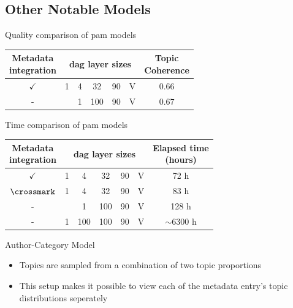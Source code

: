 \subsection{Other Notable Models}

\begin{frame}{\insertsubsection}{Quality comparison of \acrshort{pam} models}
	\centering
	\begin{tabular}{c|c|c|c|c|c|c}
		\makecell{Metadata \\ integration} & \multicolumn{5}{c}{\gls{dag} layer sizes} \vline & \makecell{Topic \\ Coherence} \\
		\hline
		$\checkmark$ & 1 & 4 & 32 & 90 & V & $0.66$\\
		- & & 1 & 100 & 90 & V & $0.67$ \\
	\end{tabular}
\end{frame}


\begin{frame}{\insertsubsection}{Time comparison of \acrshort{pam} models}
	\begin{tabular}{c|c|c|c|c|c|c}
		\makecell{Metadata \\ integration} & \multicolumn{5}{c}{\gls{dag} layer sizes} \vline & \makecell{Elapsed time \\ (hours)} \\
		\hline
		$\checkmark$ & 1 & 4 & 32 & 90 & V & 72 h\\
		$\crossmark$ & 1 & 4 & 32 & 90 & V & 83 h\\
		- & & 1 & 100 & 90 & V &  128 h\\
		- & 1 & 100 & 100 & 90 & V & $\sim 6300$ h\\
	\end{tabular}
\end{frame}

\begin{frame}{\insertsubsection}{Author-Category Model}
	\begin{figure}
		\centering
		\resizebox{0.3\columnwidth}{!}{%
			
		}
	\end{figure}
	\begin{itemize}
		\item<1-> Topics are sampled from a combination of two topic proportions
		\item<2-> This setup makes it possible to view each of the metadata entry's topic distributions seperately
	\end{itemize}
\end{frame}

